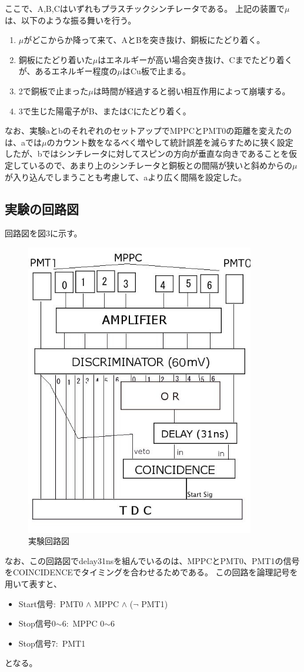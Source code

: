 ここで、A,B,Cはいずれもプラスチックシンチレータである。
上記の装置で$\mu$は、以下のような振る舞いを行う。
\begin{enumerate}
\item $\mu$がどこからか降って来て、AとBを突き抜け、銅板にたどり着く。
\item 銅板にたどり着いた$\mu$はエネルギーが高い場合突き抜け、Cまでたどり着くが、あるエネルギー程度の$\mu$はCu板で止まる。
\item 2で銅板で止まった$\mu$は時間が経過すると弱い相互作用によって崩壊する。
\item 3で生じた陽電子がB、またはCにたどり着く。
\end{enumerate}
なお、実験aとbのそれぞれのセットアップでMPPCとPMT0の距離を変えたのは、aでは$\mu$のカウント数をなるべく増やして統計誤差を減らすために狭く設定したが、bではシンチレータに対してスピンの方向が垂直な向きであることを仮定しているので、あまり上のシンチレータと銅板との間隔が狭いと斜めからの$\mu$が入り込んでしまうことも考慮して、aより広く間隔を設定した。
\subsection{実験の回路図}
回路図を図3に示す。
\begin{figure}[H]
  \centering
  \includegraphics[width=100mm, bb=0 0 500 640]{kairo2.jpg}
  \caption{実験回路図}
\end{figure}
なお、この回路図でdelay31nsを組んでいるのは、MPPCとPMT0、PMT1の信号をCOINCIDENCEでタイミングを合わせるためである。
この回路を論理記号を用いて表すと、
\begin{itemize}
  \item Start信号:\ PMT0 $\land$ MPPC $\land$ ($\lnot$ PMT1)
  \item Stop信号0$\sim$6:\  MPPC 0$\sim$6
  \item Stop信号7:\ PMT1
\end{itemize}
となる。

